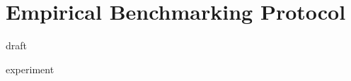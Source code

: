 \newpage
\label{chapter:benchmarking}
\chapter{Empirical Benchmarking Protocol}

{draft}

{experiment}





